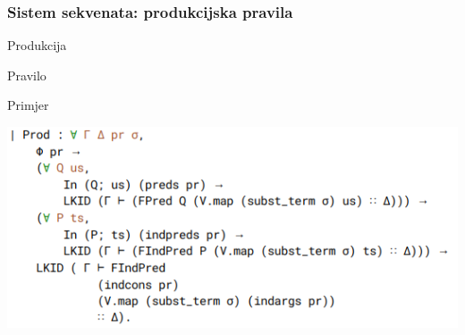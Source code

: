 \documentclass{beamer}
\begin{document}
\begin{frame}
  \frametitle{Sistem sekvenata: produkcijska pravila}
  \begin{block}{Produkcija}
    \begin{prooftree}
    \end{prooftree}
  \end{block}

  \begin{block}{Pravilo}
    \begin{scriptsize}
      \begin{prooftree}
      \end{prooftree}
    \end{scriptsize}
  \end{block}

  \begin{block}{Primjer}
    \begin{minipage}[t]{0.48\linewidth}
      \begin{prooftree}
      \end{prooftree}
    \end{minipage}
    \begin{minipage}[t]{0.48\linewidth}
      \begin{prooftree}
      \end{prooftree}
    \end{minipage}
  \end{block}
\end{frame}

\begin{frame}[plain]
  \begin{center}
    \includegraphics[width=\textwidth]{pravilo_prod}
  \end{center}
\end{frame}\addtocounter{framenumber}{-1}
\end{document}

